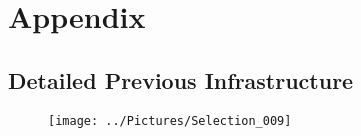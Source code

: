 \documentclass[11pt, letterpaper]{article}            %
\begin{document}


\newpage								 %
{}

\newpage
\appendix
\section{Appendix}
\subsection{ Detailed Previous Infrastructure}
\begin{figure}[h]
\texttt{[image: ../Pictures/Selection\_009]}
\end{figure}
\end{document}
